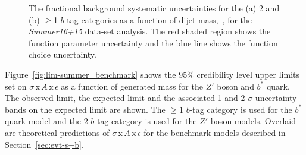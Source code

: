 \begin{figure}[!ht]
  \begin{center}
    \captionsetup[subfigure]{aboveskip=0pt,justification=centering}
  \end{center}
  \vspace{-1em}
  \caption[The background systematic uncertainties as a function of dijet mass
    in the \textit{Summer16+15} data-set analysis.]
          {The fractional background systematic uncertainties for the (a) 2 and (b) $\geq$1 $b$-tag categories
            as a function of dijet mass,~\mjj, for the \textit{Summer16+15} data-set analysis.
            The red shaded region shows the function parameter uncertainty and
            the blue line shows the function choice uncertainty.  }
          \label{fig:lim-summer_systBkg}
\end{figure}

Figure~\ref{fig:lim-summer_benchmark} shows the
95\% credibility level upper limits set on $\sigma\,\text{x}\,\mathit{A}\,\text{x}\,\epsilon$
as a function of generated mass
for the $Z'$ boson and $b^*$ quark.
The observed limit, the expected limit and the associated 1 and 2 $\sigma$ uncertainty bands on the expected limit are shown.
The $\geq1$ $b$-tag category is used for the $b^*$ quark model
and the 2 $b$-tag category is used for the $Z'$ boson models.
Overlaid are theoretical predictions of
$\sigma\,\text{x}\,\mathit{A}\,\text{x}\,\epsilon$ for the benchmark models described in Section~\ref{sec:evt-s+b}.

